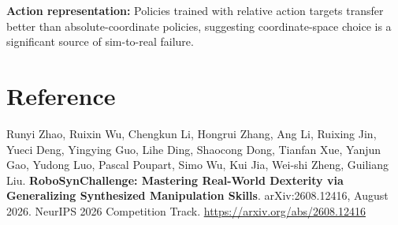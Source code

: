 \documentclass[10pt,twocolumn]{article}
\begin{document}
\textbf{Action representation:} Policies trained with relative action targets transfer
better than absolute-coordinate policies, suggesting coordinate-space choice is a
significant source of sim-to-real failure.

\section*{Reference}

Runyi Zhao, Ruixin Wu, Chengkun Li, Hongrui Zhang, Ang Li, Ruixing Jin,
Yueci Deng, Yingying Guo, Lihe Ding, Shaocong Dong, Tianfan Xue, Yanjun Gao,
Yudong Luo, Pascal Poupart, Simo Wu, Kui Jia, Wei-shi Zheng, Guiliang Liu.
\textbf{RoboSynChallenge: Mastering Real-World Dexterity via Generalizing
Synthesized Manipulation Skills}.
arXiv:2608.12416, August 2026. NeurIPS 2026 Competition Track.
\url{https://arxiv.org/abs/2608.12416}
\end{document}
